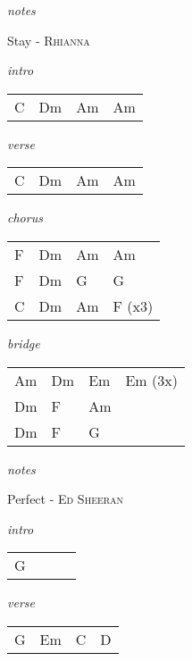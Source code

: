 \documentclass[12pt]{article}
\begin{document}
\textit{notes}

\newpage

{\Huge Stay} {\huge - \textsc{Rhianna}}

\huge
\textit{intro}

\begin{tabular}{|P{1.25in}|P{1.25in}|P{1.25in}|P{1.25in}|}
  C & Dm  & Am  & Am  \\
\end{tabular}

\textit{verse}

\begin{tabular}{|P{1.25in}|P{1.25in}|P{1.25in}|P{1.25in}|}
  C & Dm  & Am  & Am  \\
\end{tabular}

\textit{chorus}

\begin{tabular}{|P{1.25in}|P{1.25in}|P{1.25in}|P{1.25in}|}
  F & Dm  & Am  & Am  \\
  F & Dm  & G  & G  \\
  C & Dm & Am & F (x3) \\
\end{tabular}

\textit{bridge}

\begin{tabular}{|P{1.25in}|P{1.25in}|P{1.25in}|P{1.25in}|}
  Am & Dm  &  Em & Em (3x) \\
  Dm &  F   &  Am &   \\
  Dm &  F   &  G  &  \\
\end{tabular}

\textit{notes}

\newpage

{\Huge Perfect} {\huge - \textsc{Ed Sheeran}}

\huge
\textit{intro}

\begin{tabular}{|P{1.25in}|P{1.25in}|P{1.25in}|P{1.25in}|}
  G &   &   &   \\
\end{tabular}

\textit{verse}

\begin{tabular}{|P{1.25in}|P{1.25in}|P{1.25in}|P{1.25in}|}
  G &  Em & C  & D  \\
\end{tabular}
\end{document}
